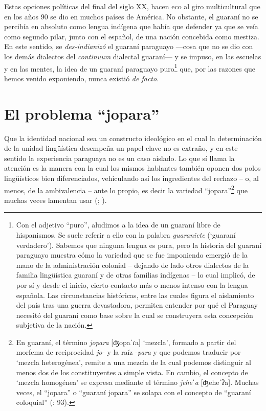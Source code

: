 \documentclass[output=paper]{langscibook}
\begin{document}
Estas opciones políticas del final del siglo XX, hacen eco al giro multicultural que en los años 90 se dio en muchos países de América. No obstante, el guaraní no se percibía en absoluto como lengua indígena que había que defender ya que se veía como segundo pilar, junto con el español, de una nación concebida como mestiza. En este sentido, se \textit{des-indianizó} \citep{Boidin2014a} el guaraní paraguayo \-—cosa que no se dio con los demás dialectos del \textit{continuum} dialectal guaraní— y se impuso, en las escuelas y en las mentes, la idea de un guaraní paraguayo puro\footnote{Con el adjetivo “puro”, aludimos a la idea de un guaraní libre de hispanismos. Se suele referir a ello con la palabra \textit{guaraniete} (‘guaraní verdadero’). Sabemos que ninguna lengua es pura, pero la historia del guaraní paraguayo muestra cómo la variedad que se fue imponiendo emergió de la mano de la administración colonial \- -- dejando de lado otros dialectos de la familia lingüística guaraní y de otras familias indígenas -- lo cual implicó, de por sí y desde el inicio, cierto contacto más o menos intenso con la lengua española. Las circunstancias históricas, entre las cuales figura el aislamiento del país tras una guerra devastadora, permiten entender por qué el Paraguay necesitó del guaraní como base sobre la cual se construyera esta concepción subjetiva de la nación.} que, por las razones que hemos venido exponiendo, nunca existió \textit{de facto}.

\section{El problema “jopara”}


Que la identidad nacional sea un constructo ideológico en el cual la determinación de la unidad lingüística desempeña un papel clave no es extraño, y en este sentido la experiencia paraguaya no es un caso aislado. Lo que sí llama la atención es la manera con la cual los mismos hablantes también oponen dos polos lingüísticos bien diferenciados, vehiculando así los ingredientes del rechazo \- -- o, al menos, de la ambivalencia -- ante lo propio, es decir la variedad “jopara”\footnote{En guaraní, el término \textit{jopara} [ʤopaˈɾa] ‘mezcla’, formado a partir del morfema de reciprocidad \textit{jo-} y la raíz -\textit{para} y que podemos traducir por ‘mezcla heterogénea’, remite a una mezcla de la cual podemos distinguir al menos dos de los constituyentes a simple vista. En cambio, el concepto de ‘mezcla homogénea’ se expresa mediante el término \textit{jeheˈa} [ʤeheˈʔa]. Muchas veces, el “jopara” o “guaraní jopara” se solapa con el concepto de “guaraní coloquial” (\citealt{Zajícová2009}: 93).} que muchas veces lamentan usar (\citealt{Hauck2014}; \citealt{Stewart2017}).
\end{document}
